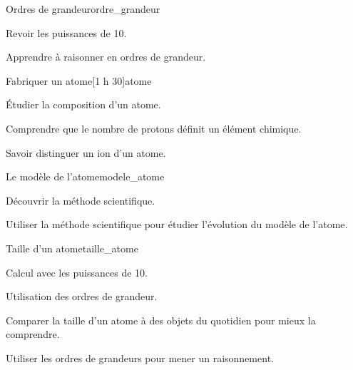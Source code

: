 \teteSndAtom

  
\phantom{\methode}\vspace*{-24pt}

\begin{multicols}{2}
  \begin{activite}{Ordres de grandeur}{ordre_grandeur}
    \begin{objectifs}  
      \item Revoir les puissances de 10.
      \item Apprendre à raisonner en ordres de grandeur.
    \end{objectifs}
  \end{activite}

  \phantom{\sndAtom}\vspace*{-24pt}
  
  \begin{activite}{Fabriquer un atome}[1 h 30]{atome}
    \begin{objectifs}
      \item Étudier la composition d'un atome.
      \item Comprendre que le nombre de protons définit un élément chimique.
      \item Savoir distinguer un ion d'un atome.
    \end{objectifs}
  \end{activite}
  
  \begin{TP}{Le modèle de l'atome}{modele_atome}
    \begin{objectifs}
        \item Découvrir la méthode scientifique.
        \item Utiliser la méthode scientifique pour étudier l'évolution du modèle de l'atome.
    \end{objectifs}
  \end{TP}
  
  \begin{activite}{Taille d'un atome}{taille_atome}
    \begin{prerequis}
      \item Calcul avec les puissances de 10.
      \item Utilisation des ordres de grandeur.
    \end{prerequis}
    \begin{objectifs}
      \item Comparer la taille d'un atome à des objets du quotidien pour mieux la comprendre.
      \item Utiliser les ordres de grandeurs pour mener un raisonnement.
    \end{objectifs}
  \end{activite}
\end{multicols}

